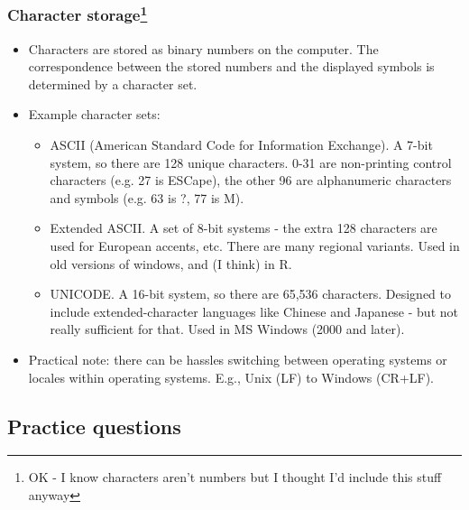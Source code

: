 \documentclass[11pt,a4paper]{article}
\begin{document}
\begin{frame}[label=current]
	\frametitle{Character storage\footnote{OK - I know characters aren't numbers but I thought I'd include this stuff anyway}}

	\begin{itemize}
	    \item Characters are stored as binary numbers on the computer.  The correspondence between the stored numbers and the displayed symbols is determined by a character set.
	\end{itemize}
\end{frame}
\begin{frame}[label=current]
	\begin{itemize}
	    \item Example character sets:
	    \begin{itemize}
	        \item ASCII (American Standard Code for Information Exchange).  A 7-bit system, so there are 128 unique characters.  0-31 are non-printing control characters (e.g. 27 is ESCape), the other 96 are alphanumeric characters and symbols (e.g. 63 is ?, 77 is M).
	        \item Extended ASCII. A set of 8-bit systems - the extra 128 characters are used for European accents, etc.  There are many regional variants.  Used in old versions of windows, and (I think) in R.
	        \item UNICODE.  A 16-bit system, so there are 65,536 characters.  Designed to include extended-character languages like Chinese and Japanese - but not really sufficient for that.  Used in MS Windows (2000 and later).
	    \end{itemize}
	\end{itemize}
\end{frame}
\begin{frame}[label=current]
	\begin{itemize}
	    \item Practical note: there can be hassles switching between operating systems or locales within operating systems. E.g., Unix (LF) to Windows (CR+LF).
	\end{itemize}
\end{frame}

\subsection*{Practice questions}
\end{document}
